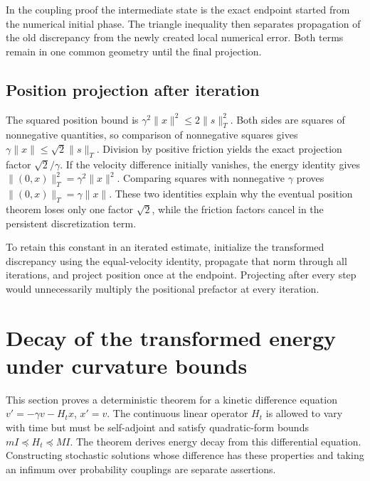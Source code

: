 \documentclass[11pt,a4paper]{report}
\begin{document}
In the coupling proof the intermediate state is the exact endpoint started from the numerical initial phase. The triangle inequality then separates propagation of the old discrepancy from the newly created local numerical error. Both terms remain in one common geometry until the final projection.

\subsection{\texorpdfstring{Position projection after iteration}{Position projection after iteration}}
\label{report-step-KineticLangevin-Geometry-lean-8}


The squared position bound is \(\gamma^2\|x\|^2\le2\|s\|_T^2\). Both sides are squares of nonnegative quantities, so comparison of nonnegative squares gives \(\gamma\|x\|\le\sqrt2\|s\|_T\). Division by positive friction yields the exact projection factor \(\sqrt2/\gamma\). If the velocity difference initially vanishes, the energy identity gives \(\|(0,x)\|_T^2=\gamma^2\|x\|^2\). Comparing squares with nonnegative \(\gamma\) proves \(\|(0,x)\|_T=\gamma\|x\|\). These two identities explain why the eventual position theorem loses only one factor \(\sqrt2\), while the friction factors cancel in the persistent discretization term.



To retain this constant in an iterated estimate, initialize the transformed discrepancy using the equal-velocity identity, propagate that norm through all iterations, and project position once at the endpoint. Projecting after every step would unnecessarily multiply the positional prefactor at every iteration.

\section{\texorpdfstring{Decay of the transformed energy under curvature bounds}{Decay of the transformed energy under curvature bounds}}
\label{proof-module-KineticLangevin-Contraction-lean}


This section proves a deterministic theorem for a kinetic difference equation \(v'=-\gamma v-H_tx\), \(x'=v\). The continuous linear operator \(H_t\) is allowed to vary with time but must be self-adjoint and satisfy quadratic-form bounds \(mI\preceq H_t\preceq MI\). The theorem derives energy decay from this differential equation. Constructing stochastic solutions whose difference has these properties and taking an infimum over probability couplings are separate assertions.
\end{document}
